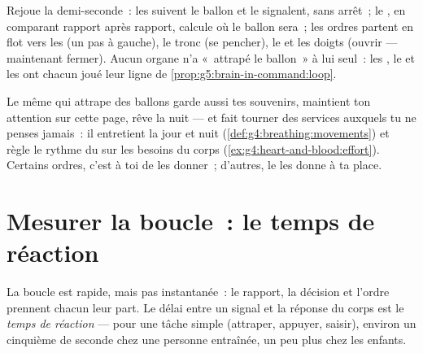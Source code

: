 \begin{example}\label{ex:g5:brain-in-command:catch}
Rejoue la demi-seconde~: les  suivent le ballon et le signalent,
sans arrêt~; le , en comparant rapport après rapport, calcule
où le ballon sera~; les ordres partent en flot vers les  (un
pas à gauche), le tronc (se pencher), le  et les doigts (ouvrir
--- maintenant fermer). Aucun organe n'a «~attrapé le ballon~» à lui
seul~: les , le  et les  ont chacun joué leur
ligne de \cref{prop:g5:brain-in-command:loop}.
\end{example}

\begin{remark}\label{rem:g5:brain-in-command:more}
Le même  qui attrape des ballons garde aussi tes souvenirs,
maintient ton attention sur cette page, rêve la nuit --- et fait
tourner des services auxquels tu ne penses jamais~: il entretient la
 jour et nuit
(\cref{def:g4:breathing:movements}) et règle le rythme du  sur
les besoins du corps (\cref{ex:g4:heart-and-blood:effort}). Certains
ordres, c'est à toi de les donner~; d'autres, le  les donne à
ta place.
\end{remark}

\section{Mesurer la boucle~: le temps de réaction}

\begin{definition}\label{def:g5:brain-in-command:reaction}
La boucle est rapide, mais pas instantanée~: le rapport, la décision
et l'ordre prennent chacun leur part. Le délai entre un signal et la
réponse du corps est le \emph{temps de réaction}
--- pour une tâche simple (attraper, appuyer, saisir),
environ un cinquième de seconde chez une personne entraînée, un peu
plus chez les enfants.
\end{definition}

